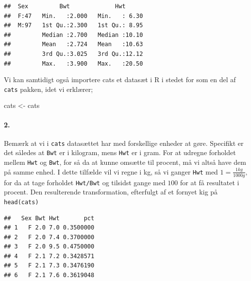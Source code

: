 \documentclass[
]{article}
\newenvironment{Shaded}{\begin{snugshade}}{\end{snugshade}}
\newcommand{\DataTypeTok}[1]{\textcolor[rgb]{0.13,0.29,0.53}{#1}}
\newcommand{\DecValTok}[1]{\textcolor[rgb]{0.00,0.00,0.81}{#1}}
\newcommand{\KeywordTok}[1]{\textcolor[rgb]{0.13,0.29,0.53}{\textbf{#1}}}
\newcommand{\NormalTok}[1]{#1}
\newcommand{\OperatorTok}[1]{\textcolor[rgb]{0.81,0.36,0.00}{\textbf{#1}}}
\newcommand{\StringTok}[1]{\textcolor[rgb]{0.31,0.60,0.02}{#1}}
\begin{document}
\begin{verbatim}
##  Sex         Bwt             Hwt       
##  F:47   Min.   :2.000   Min.   : 6.30  
##  M:97   1st Qu.:2.300   1st Qu.: 8.95  
##         Median :2.700   Median :10.10  
##         Mean   :2.724   Mean   :10.63  
##         3rd Qu.:3.025   3rd Qu.:12.12  
##         Max.   :3.900   Max.   :20.50
\end{verbatim}

Vi kan samtidigt også importere cats et datasæt i R i stedet for som en
del af \texttt{cats} pakken, idet vi erklærer;

\begin{Shaded}
\begin{Highlighting}[]
\NormalTok{cats <-}\StringTok{ }\NormalTok{cats}
\end{Highlighting}
\end{Shaded}

\hypertarget{section-1}{%
\paragraph{\texorpdfstring{\textbf{2.}}{2.}}\label{section-1}}

Bemærk at vi i \texttt{cats} datasættet har med forskellige enheder at
gøre. Specifikt er det således at \texttt{Bwt} er i kilogram, mens
\texttt{Hwt} er i gram. For at udregne forholdet mellem \texttt{Hwt} og
\texttt{Bwt}, for så da at kunne omsætte til procent, må vi altså have
dem på samme enhed. I dette tilfælde vil vi regne i kg, så vi ganger
\texttt{Hwt} med \(1=\frac{1kg}{1000g},\) for da at tage forholdet
\texttt{Hwt/Bwt} og tilsidst gange med \(100\) for at få resultatet i
procent. Den resulterende transformation, efterfulgt af et fornyet kig
på \texttt{head(cats)}

\begin{Shaded}
\end{Shaded}

\begin{verbatim}
##   Sex Bwt Hwt       pct
## 1   F 2.0 7.0 0.3500000
## 2   F 2.0 7.4 0.3700000
## 3   F 2.0 9.5 0.4750000
## 4   F 2.1 7.2 0.3428571
## 5   F 2.1 7.3 0.3476190
## 6   F 2.1 7.6 0.3619048
\end{verbatim}
\end{document}
